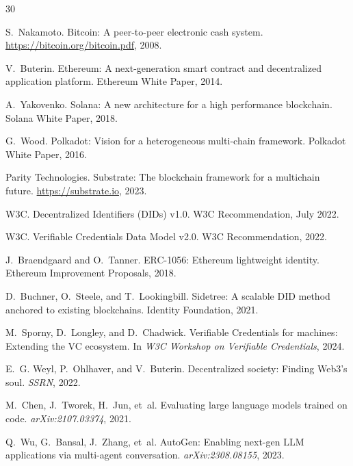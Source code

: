 \documentclass{article}
\begin{document}

\begin{thebibliography}{30}

S.~Nakamoto.
\newblock Bitcoin: A peer-to-peer electronic cash system.
\newblock \url{https://bitcoin.org/bitcoin.pdf}, 2008.

V.~Buterin.
\newblock Ethereum: A next-generation smart contract and decentralized application platform.
\newblock Ethereum White Paper, 2014.

A.~Yakovenko.
\newblock Solana: A new architecture for a high performance blockchain.
\newblock Solana White Paper, 2018.

G.~Wood.
\newblock Polkadot: Vision for a heterogeneous multi-chain framework.
\newblock Polkadot White Paper, 2016.

Parity Technologies.
\newblock Substrate: The blockchain framework for a multichain future.
\newblock \url{https://substrate.io}, 2023.

W3C.
\newblock Decentralized Identifiers (DIDs) v1.0.
\newblock W3C Recommendation, July 2022.

W3C.
\newblock Verifiable Credentials Data Model v2.0.
\newblock W3C Recommendation, 2022.

J.~Braendgaard and O.~Tanner.
\newblock ERC-1056: Ethereum lightweight identity.
\newblock Ethereum Improvement Proposals, 2018.

D.~Buchner, O.~Steele, and T.~Lookingbill.
\newblock Sidetree: A scalable DID method anchored to existing blockchains.
\newblock Identity Foundation, 2021.

M.~Sporny, D.~Longley, and D.~Chadwick.
\newblock Verifiable Credentials for machines: Extending the VC ecosystem.
\newblock In \emph{W3C Workshop on Verifiable Credentials}, 2024.

E.~G. Weyl, P.~Ohlhaver, and V.~Buterin.
\newblock Decentralized society: Finding {W}eb3's soul.
\newblock \emph{SSRN}, 2022.

M.~Chen, J.~Tworek, H.~Jun, et~al.
\newblock Evaluating large language models trained on code.
\newblock \emph{arXiv:2107.03374}, 2021.

Q.~Wu, G.~Bansal, J.~Zhang, et~al.
\newblock Auto{G}en: Enabling next-gen {LLM} applications via multi-agent conversation.
\newblock \emph{arXiv:2308.08155}, 2023.


\end{thebibliography}
\end{document}
